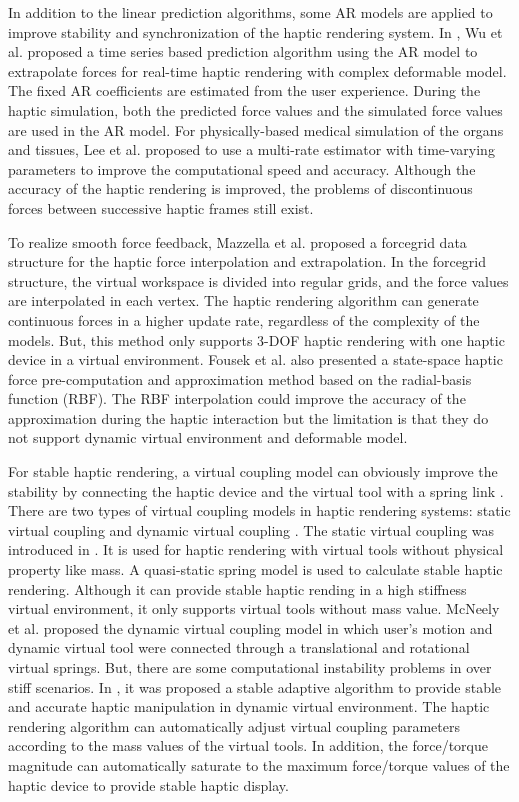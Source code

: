 \documentclass[10pt,journal,cspaper,compsoc]{IEEEtran}
\begin{document}
In addition to the linear prediction algorithms, some AR models are applied to improve stability and synchronization of the haptic rendering system. In \cite{no10}, Wu et al. proposed a time series based prediction algorithm using the AR model to extrapolate forces for real-time haptic rendering with complex deformable model. The fixed AR coefficients are estimated from the user experience. During the haptic simulation, both the predicted force values and the simulated force values are used in the AR model. For physically-based medical simulation of the organs and tissues, Lee et al. \cite{no11} proposed to use a multi-rate estimator with time-varying parameters to improve the computational speed and accuracy. Although the accuracy of the haptic rendering is improved, the problems of discontinuous forces between successive haptic frames still exist. 

To realize smooth force feedback, Mazzella et al. \cite{no12} proposed a forcegrid data structure for the haptic force interpolation and extrapolation. In the forcegrid structure, the virtual workspace is divided into regular grids, and the force values are interpolated in each vertex. The haptic rendering algorithm can generate continuous forces in a higher update rate, regardless of the complexity of the models. But, this method only supports 3-DOF haptic rendering with one haptic device in a virtual environment. Fousek et al. \cite{no13} also presented a state-space haptic force pre-computation and approximation method based on the radial-basis function (RBF). The RBF interpolation could improve the accuracy of the approximation during the haptic interaction but the limitation is that they do not support dynamic virtual environment and deformable model. 

For stable haptic rendering, a virtual coupling model can obviously improve the stability by connecting the haptic device and the virtual tool with a spring link \cite{no14}. There are two types of virtual coupling models in haptic rendering systems: static virtual coupling and dynamic virtual coupling \cite{no15}. The static virtual coupling was introduced in \cite{no16,no17}. It is used for haptic rendering with virtual tools without physical property like mass. A quasi-static spring model is used to calculate stable haptic rendering. Although it can provide stable haptic rending in a high stiffness virtual environment, it only supports virtual tools without mass value. McNeely et al. \cite{no18} proposed the dynamic virtual coupling model in which user's motion and dynamic virtual tool were connected through a translational and rotational virtual springs. But, there are some computational instability problems in over stiff scenarios. In \cite{no19}, it was proposed a stable adaptive algorithm to provide stable and accurate haptic manipulation in dynamic virtual environment. The haptic rendering algorithm can automatically adjust virtual coupling parameters according to the mass values of the virtual tools. In addition, the force/torque magnitude can automatically saturate to the maximum force/torque values of the haptic device to provide stable haptic display.
\end{document}

